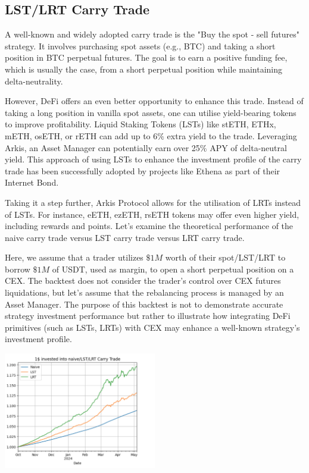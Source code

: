 \documentclass[conference]{IEEEtran}
\begin{document}
\subsection{LST/LRT Carry Trade}

A well-known and widely adopted carry trade is the "Buy the spot - sell futures" strategy. It involves purchasing spot assets (e.g., BTC) and taking a short position in BTC perpetual futures. The goal is to earn a positive funding fee, which is usually the case, from a short perpetual position while maintaining delta-neutrality.

However, DeFi offers an even better opportunity to enhance this trade. Instead of taking a long position in vanilla spot assets, one can utilise yield-bearing tokens to improve profitability. Liquid Staking Tokens (LSTs) like stETH, ETHx, mETH, osETH, or rETH can add up to 6$\%$ extra yield to the trade. Leveraging Arkis, an Asset Manager can potentially earn over 25$\%$ APY of delta-neutral yield. This approach of using LSTs to enhance the investment profile of the carry trade has been successfully adopted by projects like Ethena as part of their Internet Bond.

Taking it a step further, Arkis Protocol allows for the utilisation of LRTs instead of LSTs. For instance, eETH, ezETH, rsETH tokens may offer even higher yield, including rewards and points. Let's examine the theoretical performance of the naive carry trade versus LST carry trade versus LRT carry trade.

Here, we assume that a trader utilizes $\$1M$ worth of their spot/LST/LRT to borrow $\$1M$ of USDT, used as margin, to open a short perpetual position on a CEX. The backtest does not consider the trader's control over CEX futures liquidations, but let's assume that the rebalancing process is managed by an Asset Manager. The purpose of this backtest is not to demonstrate accurate strategy investment performance but rather to illustrate how integrating DeFi primitives (such as LSTs, LRTs) with CEX may enhance a well-known strategy's investment profile.

{
\centering
\includegraphics[width=0.5\textwidth]{images/carry_theoretical.png}
}
\end{document}
